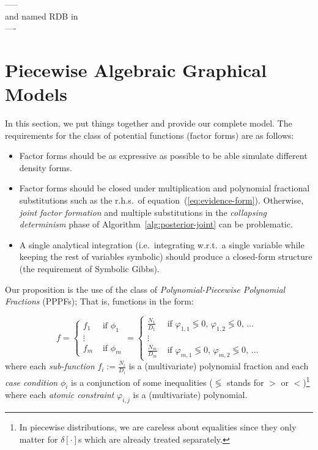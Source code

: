 \documentclass{article}
\newcommand{\case}[2]{#2 &\text{ if } #1}%
\begin{document}
-----\\
\cite{wingate2011lightweight} and named RDB in \cite{wood2014new}
\\----

\section{Piecewise Algebraic Graphical Models}
In this section, we put things together and provide our complete model.
The requirements for the class of potential functions (factor forms) are as follows:
\begin{itemize}
\item Factor forms should be as expressive as possible to be able simulate different density forms.  
\item Factor forms should be closed under multiplication and polynomial fractional substitutions such as 
the r.h.s.\ of equation~(\ref{eq:evidence-form}). Otherwise, \emph{joint factor formation} and multiple substitutions in the \emph{collapsing determinism} phase of 
Algorithm~\ref{alg:posterior-joint} can be problematic.
\item A single analytical integration 
(i.e.\ integrating w.r.t.\ a single variable while keeping the rest of variables symbolic) should produce a closed-form structure (the requirement of Symbolic Gibbs).
\end{itemize}   

Our proposition is the use of 
the class of \emph{Polynomial-Piecewise Polynomial Fractions} (PPPFs); That is,   
functions in the form:

\begin{equation}
\label{e:ppf}
f = 
  \begin{cases}
  \case{\phi_1}{f_1}\\
\vdots\\
  \case{\phi_m}{f_m}    
  \end{cases}
\!\!\!=
  \begin{cases}
  \case{\varphi_{1,1} \lessgtr 0,\, \varphi_{1,2} \lessgtr 0,\, \ldots}{\frac{N_1}{D_1}} \\
\vdots\\
   \case{\varphi_{m,1} \lessgtr 0,\, \varphi_{m,2} \lessgtr 0,\, \ldots}{\frac{N_m}{D_m}}    
  \end{cases}
\end{equation}
where each \emph{sub-function} $f_i := \frac{N_i}{D_i}$ is a (multivariate) polynomial fraction and 
each \emph{case condition} $\phi_i$ is a conjunction of some inequalities ($\lessgtr$ stands for  
$>$ or $<$)\footnote{In piecewise distributions,  
we are careless about equalities since they only matter for $\delta[\cdot]$s which are already treated separately.} 
where each \emph{atomic constraint} $\varphi_{i,j}$ is a (multivariate) polynomial.
\end{document}

